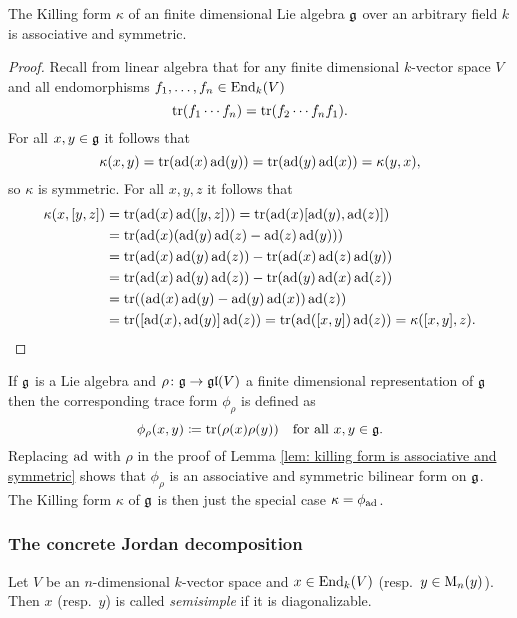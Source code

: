 \begin{lem}\label{lem: killing form is associative and symmetric}
 The Killing form $\kappa$ of an finite dimensional Lie algebra $\mathfrak{g}$ over an arbitrary field $k$ is associative and symmetric.
\end{lem}
\begin{proof}
 Recall from linear algebra that for any finite dimensional $k$-vector space $V$ and all endomorphisms $f_1, \dotsc, f_n \in \operatorname{End}_k(V)$
 \[
  \operatorname{tr}(f_1 \dotsm f_n) = \operatorname{tr}(f_2 \dotsm f_n f_1).
 \]
 For all $x,y \in \mathfrak{g}$ it follows that
 \[
  \kappa(x,y) = \operatorname{tr}(\operatorname{ad}(x) \operatorname{ad}(y)) = \operatorname{tr}(\operatorname{ad}(y) \operatorname{ad}(x)) = \kappa(y,x),
 \]
 so $\kappa$ is symmetric. For all $x,y,z$ it follows that
 \begin{align*}
  \kappa(x,[y,z])
  &= \operatorname{tr}(\operatorname{ad}(x) \operatorname{ad}([y,z]))
  = \operatorname{tr}(\operatorname{ad}(x) [\operatorname{ad}(y), \operatorname{ad}(z)]) \\
  &= \operatorname{tr}(\operatorname{ad}(x) (\operatorname{ad}(y) \operatorname{ad}(z) - \operatorname{ad}(z) \operatorname{ad}(y))) \\
  &= \operatorname{tr}(\operatorname{ad}(x) \operatorname{ad}(y) \operatorname{ad}(z)) - \operatorname{tr}(\operatorname{ad}(x) \operatorname{ad}(z) \operatorname{ad}(y)) \\
  &= \operatorname{tr}(\operatorname{ad}(x) \operatorname{ad}(y) \operatorname{ad}(z)) - \operatorname{tr}(\operatorname{ad}(y) \operatorname{ad}(x) \operatorname{ad}(z)) \\
  &= \operatorname{tr}((\operatorname{ad}(x) \operatorname{ad}(y)- \operatorname{ad}(y) \operatorname{ad}(x)) \operatorname{ad}(z)) \\
  &= \operatorname{tr}([\operatorname{ad}(x), \operatorname{ad}(y)] \operatorname{ad}(z))
  = \operatorname{tr}(\operatorname{ad}([x,y]) \operatorname{ad}(z))
  = \kappa([x,y],z).
 \qedhere
 \end{align*}
\end{proof}


\begin{rem}
 If $\mathfrak{g}$ is a Lie algebra and $\rho \colon \mathfrak{g} \to \mathfrak{gl}(V)$ a finite dimensional representation of $\mathfrak{g}$ then the corresponding trace form $\phi_\rho$ is defined as
 \[
  \phi_\rho(x,y) \coloneqq \operatorname{tr}(\rho(x) \rho(y)) \quad \text{for all $x,y \in \mathfrak{g}$}.
 \]
 Replacing $\operatorname{ad}$ with $\rho$ in the proof of Lemma \ref{lem: killing form is associative and symmetric} shows that $\phi_\rho$ is an associative and symmetric bilinear form on $\mathfrak{g}$. The Killing form $\kappa$ of $\mathfrak{g}$ is then just the special case $\kappa = \phi_{\operatorname{ad}}$.
\end{rem}




\subsubsection{The concrete Jordan decomposition}


\begin{defi}
 Let $V$ be an $n$-dimensional $k$-vector space and $x \in \operatorname{End}_k(V)$ (resp.\ $y \in \operatorname{M}_n(y)$). Then $x$ (resp.\ $y$) is called \emph{semisimple} if it is diagonalizable.
\end{defi}


